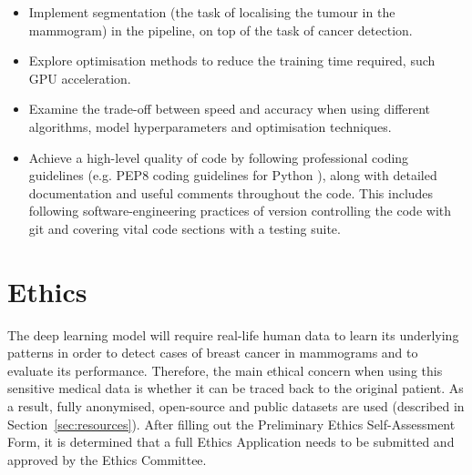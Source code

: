 \documentclass[letterpaper,12pt]{article}
\begin{document}
\begin{itemize}
    \item Implement segmentation (the task of localising the tumour in the mammogram) in the pipeline, on top of the task of cancer detection.
    \item Explore optimisation methods to reduce the training time required, such  GPU acceleration.
    \item Examine the trade-off between speed and accuracy when using different algorithms, model hyperparameters and optimisation techniques.
    \item Achieve a high-level quality of code by following professional coding guidelines (e.g. PEP8 coding guidelines for Python \cite{pep8}), along with detailed documentation and useful comments throughout the code. This includes following software-engineering practices of version controlling the code with git and covering vital code sections with a testing suite.
\end{itemize}



\section{Ethics}
\label{sec:ethics}

The deep learning model will require real-life human data to learn its underlying patterns in order to detect cases of breast cancer in mammograms and to evaluate its performance. Therefore, the main ethical concern when using this sensitive medical data is whether it can be traced back to the original patient. As a result, fully anonymised, open-source and public datasets are used (described in Section~\ref{sec:resources}). After filling out the Preliminary Ethics Self-Assessment Form, it is determined that a full Ethics Application needs to be submitted and approved by the Ethics Committee.
\end{document}
